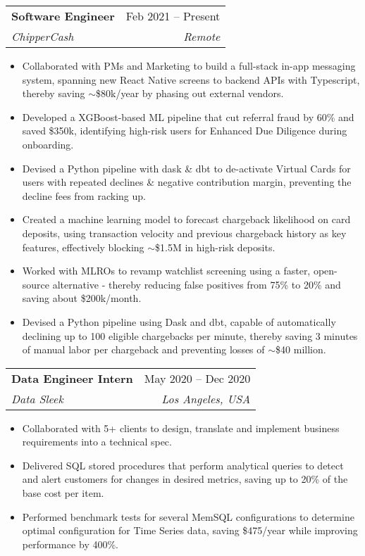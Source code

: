 \documentclass[letterpaper,11pt]{article}
\makeatletter
\newcommand{\resumeItem}[1]{
  \item\small{
    {#1 \vspace{-2pt}}
  }
}
\newcommand{\resumeSubheading}[4]{
  \vspace{-2pt}\item
    \begin{tabular*}{0.97\textwidth}[t]{l@{\extracolsep{\fill}}r}
      \textbf{#1} & #2 \\
      \textit{\small#3} & \textit{\small #4} \\
    \end{tabular*}\vspace{-7pt}
}
\newcommand{\resumeSubSubheading}[2]{
    \item
    \begin{tabular*}{0.97\textwidth}{l@{\extracolsep{\fill}}r}
      \textit{\small#1} & \textit{\small #2} \\
    \end{tabular*}\vspace{-7pt}
}
\newcommand{\resumeSubHeadingListEnd}{\end{itemize}}
\newcommand{\resumeItemListStart}{\begin{itemize}}
\newcommand{\resumeItemListEnd}{\end{itemize}\vspace{-5pt}}
\makeatother
\begin{document}
    \resumeSubheading
      {Software Engineer}{Feb 2021 -- Present}
      {ChipperCash}{Remote}
      \resumeItemListStart
        \resumeItem{Collaborated with PMs and Marketing to build a full-stack in-app messaging system, spanning new React Native screens
to backend APIs with Typescript, thereby saving $\sim$\$80k/year by phasing out external vendors.}
        \resumeItem{Developed a XGBoost-based ML pipeline that cut referral fraud by 60\% and saved \$350k, identifying high-risk users for Enhanced Due Diligence during onboarding.}
        \resumeItem{Devised a Python pipeline with dask \& dbt to de-activate Virtual Cards for users with repeated declines \& negative contribution margin, preventing the decline fees from racking up.}
        \resumeItem{Created a machine learning model to forecast chargeback likelihood on card deposits, using transaction velocity and previous chargeback history as key features, effectively blocking $\sim$\$1.5M in high-risk deposits.}
        \resumeItem{Worked with MLROs to revamp watchlist screening using a faster, open-source alternative - thereby reducing false positives from 75\% to 20\% and saving about \$200k/month.}
        \resumeItem{Devised a Python pipeline using Dask and dbt, capable of automatically declining up to 100 eligible chargebacks per minute, thereby saving 3 minutes of manual labor per chargeback and preventing losses of $\sim$\$40 million.}
      \resumeItemListEnd
      

    \resumeSubheading
      {Data Engineer Intern}{May 2020 -- Dec 2020}
      {Data Sleek}{Los Angeles, USA}
      \resumeItemListStart
        \resumeItem{Collaborated with 5+ clients to design, translate and implement business requirements into a technical spec.}
        \resumeItem{Delivered SQL stored procedures that perform analytical queries to detect and alert customers for changes in desired
metrics, saving up to 20\% of the base cost per item.}
        \resumeItem{Performed benchmark tests for several MemSQL configurations to determine optimal configuration for Time Series data, saving \$475/year while improving performance by 400\%.}
    \resumeItemListEnd
\end{document}
